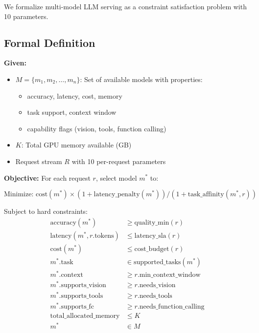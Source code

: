 \documentclass[11pt]{article}
\begin{document}
We formalize multi-model LLM serving as a constraint satisfaction problem with 10 parameters.

\subsection{Formal Definition}

\textbf{Given:}
\begin{itemize}
    \item $M = \{m_1, m_2, \ldots, m_n\}$: Set of available models with properties:
    \begin{itemize}
        \item accuracy, latency, cost, memory
        \item task support, context window
        \item capability flags (vision, tools, function calling)
    \end{itemize}
    \item $K$: Total GPU memory available (GB)
    \item Request stream $R$ with 10 per-request parameters
\end{itemize}

\textbf{Objective:} For each request $r$, select model $m^*$ to:

\begin{equation}
\text{Minimize: } \text{cost}(m^*) \times (1 + \text{latency\_penalty}(m^*)) / (1 + \text{task\_affinity}(m^*, r))
\end{equation}

Subject to hard constraints:
\begin{align}
\text{accuracy}(m^*) &\geq \text{quality\_min}(r) \\
\text{latency}(m^*, r.\text{tokens}) &\leq \text{latency\_sla}(r) \\
\text{cost}(m^*) &\leq \text{cost\_budget}(r) \\
m^*.\text{task} &\in \text{supported\_tasks}(m^*) \\
m^*.\text{context} &\geq r.\text{min\_context\_window} \\
m^*.\text{supports\_vision} &\geq r.\text{needs\_vision} \\
m^*.\text{supports\_tools} &\geq r.\text{needs\_tools} \\
m^*.\text{supports\_fc} &\geq r.\text{needs\_function\_calling} \\
\text{total\_allocated\_memory} &\leq K \\
m^* &\in M
\end{align}
\end{document}
